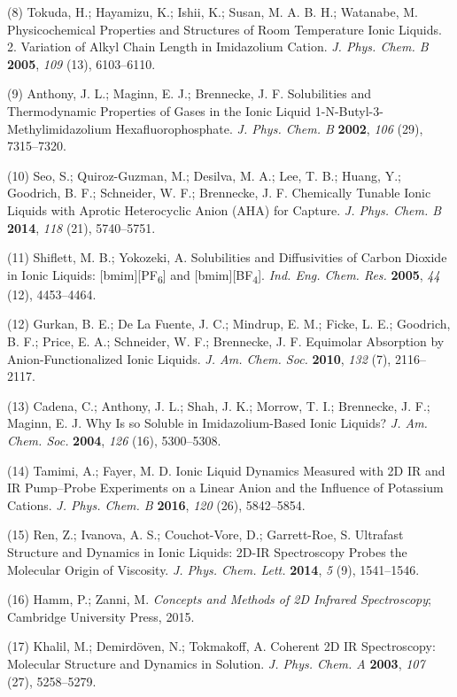\documentclass[]{article}
\begin{document}
(8) Tokuda, H.; Hayamizu, K.; Ishii, K.; Susan, M. A. B. H.; Watanabe,
M. Physicochemical Properties and Structures of Room Temperature Ionic
Liquids. 2. Variation of Alkyl Chain Length in Imidazolium Cation.
\emph{J. Phys. Chem. B} \textbf{2005}, \emph{109} (13), 6103--6110.

(9) Anthony, J. L.; Maginn, E. J.; Brennecke, J. F. Solubilities and
Thermodynamic Properties of Gases in the Ionic Liquid
1-N-Butyl-3-Methylimidazolium Hexafluorophosphate. \emph{J. Phys. Chem.
B} \textbf{2002}, \emph{106} (29), 7315--7320.

(10) Seo, S.; Quiroz-Guzman, M.; Desilva, M. A.; Lee, T. B.; Huang, Y.;
Goodrich, B. F.; Schneider, W. F.; Brennecke, J. F. Chemically Tunable
Ionic Liquids with Aprotic Heterocyclic Anion (AHA) for
 Capture. \emph{J. Phys. Chem. B} \textbf{2014},
\emph{118} (21), 5740--5751.

(11) Shiflett, M. B.; Yokozeki, A. Solubilities and Diffusivities of
Carbon Dioxide in Ionic Liquids: {[}bmim{]}{[}PF\textsubscript{6}{]} and
{[}bmim{]}{[}BF\textsubscript{4}{]}. \emph{Ind. Eng. Chem. Res.}
\textbf{2005}, \emph{44} (12), 4453--4464.

(12) Gurkan, B. E.; De La Fuente, J. C.; Mindrup, E. M.; Ficke, L. E.;
Goodrich, B. F.; Price, E. A.; Schneider, W. F.; Brennecke, J. F.
Equimolar  Absorption by Anion-Functionalized Ionic
Liquids. \emph{J. Am. Chem. Soc.} \textbf{2010}, \emph{132} (7),
2116--2117.

(13) Cadena, C.; Anthony, J. L.; Shah, J. K.; Morrow, T. I.; Brennecke,
J. F.; Maginn, E. J. Why Is  so Soluble in
Imidazolium-Based Ionic Liquids? \emph{J. Am. Chem. Soc.} \textbf{2004},
\emph{126} (16), 5300--5308.

(14) Tamimi, A.; Fayer, M. D. Ionic Liquid Dynamics Measured with 2D IR
and IR Pump--Probe Experiments on a Linear Anion and the Influence of
Potassium Cations. \emph{J. Phys. Chem. B} \textbf{2016}, \emph{120}
(26), 5842--5854.

(15) Ren, Z.; Ivanova, A. S.; Couchot-Vore, D.; Garrett-Roe, S.
Ultrafast Structure and Dynamics in Ionic Liquids: 2D-IR Spectroscopy
Probes the Molecular Origin of Viscosity. \emph{J. Phys. Chem. Lett.}
\textbf{2014}, \emph{5} (9), 1541--1546.

(16) Hamm, P.; Zanni, M. \emph{Concepts and Methods of 2D Infrared
Spectroscopy}; Cambridge University Press, 2015.

(17) Khalil, M.; Demirdöven, N.; Tokmakoff, A. Coherent 2D IR
Spectroscopy: Molecular Structure and Dynamics in Solution. \emph{J.
Phys. Chem. A} \textbf{2003}, \emph{107} (27), 5258--5279.
\end{document}
